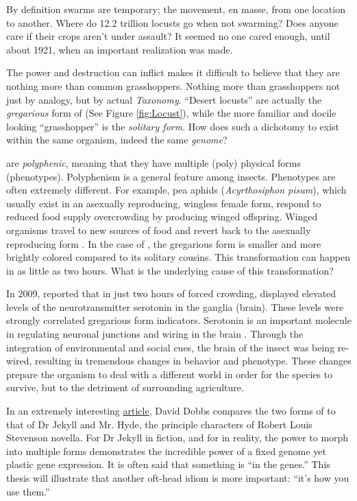     By definition swarms are temporary; the movement, en masse, from one location to another. Where do 12.2 trillion locusts go when not swarming? Does anyone care if their crops aren't under assault? It seemed no one cared enough, until about 1921, when an important realization was made.

    The power and destruction \locusts{} can inflict makes it difficult to believe that they are nothing more than common grasshoppers. Nothing more than grasshoppers not just by analogy, but by actual \textit{Taxonomy}. ``Desert locusts'' are actually the \textit{gregarious} form  of \locusts{} (See Figure \ref{fig:Locust}), while the more familiar and docile looking ``grasshopper'' is the \textit{solitary form}. How does such a dichotomy to exist within the same organism, indeed the same \textit{genome}?

    \locusts{} are \textit{polyphenic}, meaning that they have multiple (poly) physical forms (phenotypes). Polyphenism is a general feature among insects. Phenotypes are often extremely different. For example, pea aphids (\textit{Acyrthosiphon pisum}), which usually exist in an asexually reproducing, wingless female form, respond to reduced food supply overcrowding by producing winged offspring. Winged organisms travel to new sources of food and revert back to the asexually reproducing form \citep{Shingleton2003,Purandare2014b}. In the case of \locusts{}, the gregarious form is smaller and more brightly colored compared to its solitary cousins. This transformation can happen in as little as two hours. What is the underlying cause of this transformation?

    In 2009, \citet{Anstey2009} reported that in just two hours of forced crowding, \locusts{} displayed elevated levels of the neurotransmitter serotonin in the ganglia (brain). These levels were strongly correlated gregarious form indicators. Serotonin is an important molecule in regulating neuronal junctions and wiring in the brain \citep{Hoeffer2003}. Through the integration of environmental and social cues, the brain of the insect was being re-wired, resulting in tremendous changes in behavior and phenotype. These changes prepare the organism to deal with a different world in order for the species to survive, but to the detriment of surrounding agriculture.

    In an extremely interesting \href{http://aeon.co/magazine/nature-and-cosmos/why-its-time-to-lay-the-selfish-gene-to-rest/}{article}, David Dobbs compares the two forms of \locusts{} to that of Dr Jekyll and Mr. Hyde, the principle characters of Robert Louis Stevenson novella. For Dr Jekyll in fiction, and for \locusts{} in reality, the power to morph into multiple forms demonstrates the incredible power of a fixed genome yet plastic gene expression. It is often said that something is ``in the genes.'' This thesis will illustrate that another oft-head idiom is more important: ``it's how you use them.'' 

